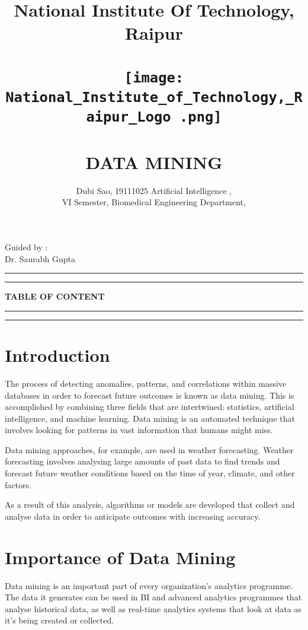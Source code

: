 \documentclass[12pt,letterpaper]{article}
\begin{document}
\title{
\textbf{National Institute Of Technology, Raipur\\ 
 \\ \texttt{[image: National\_Institute\_of\_Technology,\_Raipur\_Logo .png]}
\\ \\
DATA MINING}
}

\author{Dubi Sao, 19111025 
Artificial Intelligence ,\\ VI Semester,
        Biomedical Engineering Department,\\
        }
\date{}
\maketitle
\begin{flushright}
    Guided by :\\
    Dr. Saurabh Gupta
\end{flushright}
\rule{\textwidth}{1pt}
\begin{abstract}



\end{abstract}
\rule{\textwidth}{1pt}
\newpage
\textbf{TABLE OF CONTENT}\\
\rule{\textwidth}{1pt}
\tableofcontents
\rule{\textwidth}{1pt}

\section{Introduction}
The process of detecting anomalies, patterns, and correlations within massive databases in order to forecast future outcomes is known as data mining. This is accomplished by combining three fields that are intertwined: statistics, artificial intelligence, and machine learning. Data mining is an automated technique that involves looking for patterns in vast information that humans might miss.


Data mining approaches, for example, are used in weather forecasting. Weather forecasting involves analysing large amounts of past data to find trends and forecast future weather conditions based on the time of year, climate, and other factors.



As a result of this analysis, algorithms or models are developed that collect and analyse data in order to anticipate outcomes with increasing accuracy.

\section{Importance of Data Mining}
Data mining is an important part of every organization's analytics programme. The data it generates can be used in BI and advanced analytics programmes that analyse historical data, as well as real-time analytics systems that look at data as it's being created or collected.
\end{document}
